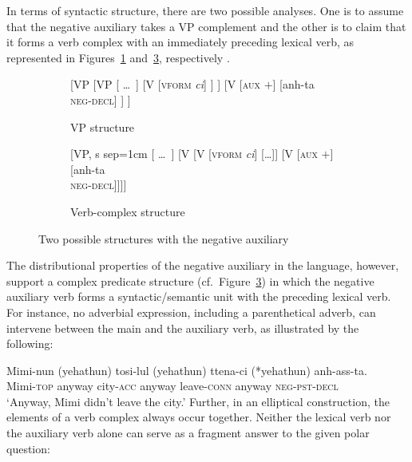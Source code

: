 \documentclass[output=paper
	        ,collection
	        ,collectionchapter
 	        ,biblatex
                ,babelshorthands
                ,newtxmath
                ,draftmode
                ,colorlinks, citecolor=brown
]{langscibook}
\begin{document}
\begin{exe}
\begin{xlist}
\begin{exe}
\begin{xlist}
In terms of syntactic structure, there
are two possible analyses.  One is to assume that the negative auxiliary takes a VP complement and the other is to claim that it forms a verb complex with
an immediately preceding lexical verb, as represented in Figures~\ref{negation-fig:3a} and~\ref{negation-fig:3b}, respectively
\citep{Chung98a-u, Kim:16}.
%
\begin{figure}
	\begin{subfigure}[b]{0.48\textwidth}
\centering
		\begin{forest}
			[VP
				[VP
					[ \dots\ ]
					[V {[\textsc{vform} \textit{ci}]}
					]
					]
				[V {[\textsc{aux $+$}]}
					[anh-ta\\ \textsc{neg-decl}]
				]
			]	
		\end{forest}
	\caption{VP structure}\label{negation-fig:3a}
		\end{subfigure}	
\hfill
	\begin{subfigure}[b]{0.48\textwidth}
\centering
		\begin{forest}
			[VP, s sep=1cm
				[ \dots\ ]
				[V
					[V {[\textsc{vform} \textit{ci}]}
						[\dots]]
					[V {[\textsc{aux $+$}]}
						[anh-ta\\ \textsc{neg-decl}]]]]
		\end{forest}
	\caption{Verb-complex structure}\label{negation-fig:3b}	
		\end{subfigure}
	\caption{Two possible structures with the negative auxiliary}
\end{figure}

The distributional properties of the negative auxiliary in the language, however, support
 a complex predicate structure (cf.\ Figure~\ref{negation-fig:3b}) in which the negative auxiliary verb
forms a syntactic/semantic unit with the preceding lexical verb.
For instance, no adverbial expression, including
a parenthetical adverb, can intervene between
the main and the auxiliary verb, as illustrated by the
following:

\ea
\gll Mimi-nun          (yehathun)           tosi-lul          (yehathun)           ttena-ci            (*yehathun) anh-ass-ta. \\
     Mimi-\textsc{top} anyway city-\textsc{acc} anyway leave-\textsc{conn} anyway \textsc{neg}-\textsc{pst}-\textsc{decl} \\
\glt `Anyway, Mimi didn't leave the city.'
\z
%
Further, in an elliptical construction, the elements of a verb complex
 always occur together. Neither the lexical  verb nor the auxiliary verb alone can serve
as a fragment answer to the given polar question:


\end{xlist}
\end{exe}
\end{xlist}
\end{exe}
\end{document}
